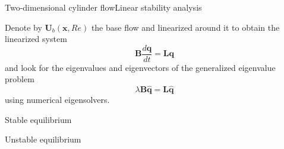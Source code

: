 \documentclass[usenames,dvipsnames,svgnames,10pt,aspectratio=169]{beamer}
\begin{document}
\begin{frame}[t, c]{Two-dimensional cylinder flow}{Linear stability analysis}
  \begin{minipage}{.58\textwidth}
    Denote by $\bm{U}_b(\bm{x}, Re)$ the base flow and linearized around it to obtain the linearized system
    \[
    \bm{B} \dfrac{d\bm{q}}{dt} = \bm{Lq}
    \]
    and look for the eigenvalues and eigenvectors of the generalized eigenvalue problem
    \[
    \lambda \bm{B} \hat{\bm{q}} = \bm{L} \hat{\bm{q}}
    \]
    using numerical eigensolvers.
  \end{minipage}%
  \hfill
  \begin{minipage}{.38\textwidth}
    \centering

    \bigskip

    Stable equilibrium

    \bigskip

    \bigskip


    Unstable equilibrium
  \end{minipage}
\end{frame}
\end{document}
